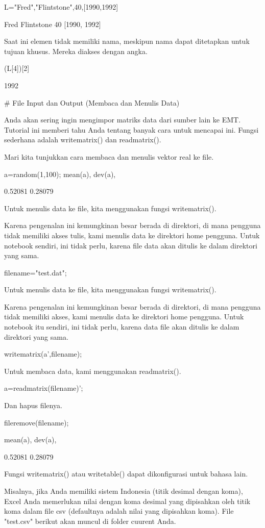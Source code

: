 \documentclass{article}
\begin{document}
\>L={{"Fred","Flintstone",40,[1990,1992]}}


    Fred
    Flintstone
    40
    [1990,  1992]

Saat ini elemen tidak memiliki nama, meskipun nama dapat ditetapkan
untuk tujuan khusus. Mereka diakses dengan angka.


\>(L[4])[2]


    1992

# File Input dan Output (Membaca dan Menulis Data)

Anda akan sering ingin mengimpor matriks data dari sumber lain ke EMT.
Tutorial ini memberi tahu Anda tentang banyak cara untuk mencapai ini.
Fungsi sederhana adalah writematrix() dan readmatrix().


Mari kita tunjukkan cara membaca dan menulis vektor real ke file.


\>a=random(1,100); mean(a), dev(a),


    0.52081
    0.28079

Untuk menulis data ke file, kita menggunakan fungsi writematrix().


Karena pengenalan ini kemungkinan besar berada di direktori, di mana
pengguna tidak memiliki akses tulis, kami menulis data ke direktori
home pengguna. Untuk notebook sendiri, ini tidak perlu, karena file
data akan ditulis ke dalam direktori yang sama.


\>filename="test.dat";


Untuk menulis data ke file, kita menggunakan fungsi writematrix().


Karena pengenalan ini kemungkinan besar berada di direktori, di mana
pengguna tidak memiliki akses, kami menulis data ke direktori home
pengguna. Untuk notebook itu sendiri, ini tidak perlu, karena data
file akan ditulis ke dalam direktori yang sama.


\>writematrix(a',filename);


Untuk membaca data, kami menggunakan readmatrix().


\>a=readmatrix(filename)';


Dan hapus filenya.


\>fileremove(filename);

\>mean(a), dev(a),


    0.52081
    0.28079

Fungsi writematrix() atau writetable() dapat dikonfigurasi untuk
bahasa lain.


Misalnya, jika Anda memiliki sistem Indonesia (titik desimal dengan
koma), Excel Anda memerlukan nilai dengan koma desimal yang dipisahkan
oleh titik koma dalam file csv (defaultnya adalah nilai yang
dipisahkan koma). File "test.csv" berikut akan muncul di folder
cuurent Anda.
\end{document}
